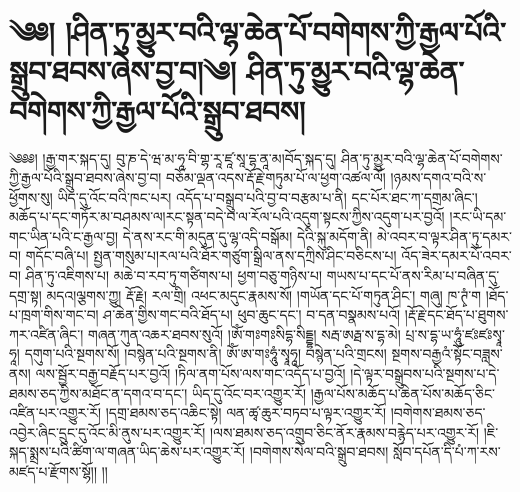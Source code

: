 \chapter{༄༅། །ཤིན་ཏུ་མྱུར་བའི་ལྷ་ཆེན་པོ་བགེགས་ཀྱི་རྒྱལ་པོའི་སྒྲུབ་ཐབས་ཞེས་བྱ་བ།༄། ཤིན་ཏུ་མྱུར་བའི་ལྷ་ཆེན་བགེགས་ཀྱི་རྒྱལ་པོའི་སྒྲུབ་ཐབས།}༄༅༅། །རྒྱ་གར་སྐད་དུ། བུ་ཎ་དེ་ཝ་མ་ཧཱ་བི་གྷ་རཱ་ཛཱ་སཱ་དྷ་ནཱ་མ།བོད་སྐད་དུ། ཤིན་ཏུ་མྱུར་བའི་ལྷ་ཆེན་པོ་བགེགས་ཀྱི་རྒྱལ་པོའི་སྒྲུབ་ཐབས་ཞེས་བྱ་བ། བཅོམ་ལྡན་འདས་རྡོ་རྗེ་གཏུམ་པོ་ལ་ཕྱག་འཚལ་ལོ། །ཉམས་དགའ་བའི་ས་ཕྱོགས་སུ། ཡིད་དུ་འོང་བའི་ཁང་པར། འདོད་པ་བསྒྲུབ་པའི་བྱ་བ་བརྩམ་པ་ནི། དང་པོར་ཐང་ཀ་དགྲམ་ཞིང་། མཆོད་པ་དང་གཏོར་མ་བཤམས་ལ།རང་སྟན་བདེ་བ་ལ་རོལ་པའི་འདུག་སྟངས་ཀྱིས་འདུག་པར་བྱའོ། །རང་ཡི་དམ་གང་ཡིན་པའི་ང་རྒྱལ་བྱ། དེ་ནས་རང་གི་མདུན་དུ་ལྷ་འདི་བསྒོམ། དེའི་སྐུ་མདོག་ནི། མེ་འབར་བ་ལྟར་ཤིན་ཏུ་དམར་བ། གདོང་བཞི་པ། སྤྱན་གསུམ་པ།རལ་པའི་ཐོར་གཙུག་སྒྲིལ་ནས་དཀྲིས་ཤིང་བཅིངས་པ། འོད་ཟེར་དམར་པོ་འབར་བ། ཤིན་ཏུ་འཇིགས་པ། མཆེ་བ་རབ་ཏུ་གཙིགས་པ། ཕྱག་བཅུ་གཉིས་པ། གཡས་པ་དང་པོ་ནས་རིམ་པ་བཞིན་དུ་དགྲ་སྟ། མདའ།ལྕགས་ཀྱུ། རྡོ་རྗེ། རལ་གྲི། འཕང་མདུང་རྣམས་སོ། །གཡོན་དང་པོ་གཏུན་ཤིང་། གཞུ། ཁ་ཊྭཾ་ག །ཐོད་པ་ཁྲག་གིས་གང་བ། ཤ་ཆེན་གྱིས་གང་བའི་ཐོད་པ། ཕུབ་ཆུང་དང་། བ་དན་བསྣམས་པའོ། །རྡོ་རྗེ་དང་ཐོད་པ་ཐུགས་ཀར་འཛིན་ཞིང་། གཞན་ཀུན་འཆར་ཐབས་སུའོ། །ཨོཾ་གཿགཿསིདྷ་སིདྡྷ། སརྦ་ཨརྠ་ས་དྷ་མེ། པྲ་ས་དྷ་ཡ་ཧཱུཾ་ཛཿཛཿསྭཱ་ཧཱ། དགུག་པའི་སྔགས་སོ། །བསྙེན་པའི་སྔགས་ནི། ཨོཾ་ཨ་གཿཧཱུཾ་སྭཱཧཱ། བསྙེན་པའི་གྲངས། སྔགས་བརྒྱའཾ་སྟོང་བཟླས་ནས། ལས་སྦྱོར་བརྒྱ་བརྗོད་པར་བྱའོ། །ཏིལ་ནག་པོས་ལས་གང་འདོད་པ་བྱའོ། །དེ་ལྟར་བསྒྲུབས་པའི་སྔགས་པ་དེ་ཐམས་ཅད་ཀྱིས་མཐོང་ན་དགའ་བ་དང་། ཡིད་དུ་འོང་བར་འགྱུར་རོ། །རྒྱལ་པོས་མཆོད་པ་ཆེན་པོས་མཆོད་ཅིང་འཛིན་པར་འགྱུར་རོ། །དགྲ་ཐམས་ཅད་འཆིང་སྟེ། ལན་ཚྭ་ཆུར་བཏབ་པ་ལྟར་འགྱུར་རོ། །བགེགས་ཐམས་ཅད་འབྱེར་ཞིང་དྲུང་དུ་འོང་མི་ནུས་པར་འགྱུར་རོ། །ལས་ཐམས་ཅད་འགྲུབ་ཅིང་ནོར་རྣམས་བརྙེད་པར་འགྱུར་རོ། །ཇི་སྐད་སྨྲས་པའི་ཚིག་ལ་གཞན་ཡིད་ཆེས་པར་འགྱུར་རོ། །བགེགས་སེལ་བའི་སྒྲུབ་ཐབས། སློབ་དཔོན་དི་པཾ་ཀ་རས་མཛད་པ་རྫོགས་སྷོ།། །།